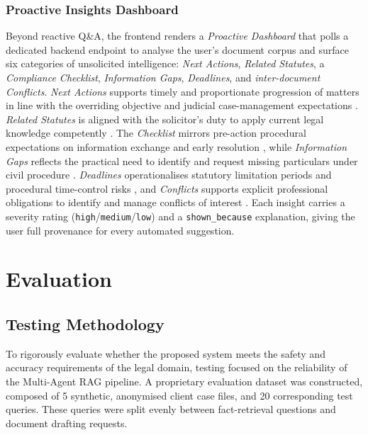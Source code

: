 \documentclass[11pt,a4paper]{article}
\begin{document}
\subsubsection{Proactive Insights Dashboard}

Beyond reactive Q\&A, the frontend renders a \textit{Proactive Dashboard} that polls a
dedicated backend endpoint to analyse the user's document corpus and surface six categories
of unsolicited intelligence: \textit{Next Actions}, \textit{Related Statutes}, a
\textit{Compliance Checklist}, \textit{Information Gaps}, \textit{Deadlines}, and
\textit{inter-document Conflicts}.  \textit{Next Actions} supports timely and proportionate progression of
matters in line with the overriding objective and judicial case-management expectations
\cite{cpr1_2025,cpr3_2025}.  \textit{Related Statutes} is aligned with the solicitor's duty
to apply current legal knowledge competently \cite{sra_competence_2023,sra2023}.  The
\textit{Checklist} mirrors pre-action procedural expectations on information exchange and
early resolution \cite{cpr_papd_2025}, while \textit{Information Gaps} reflects the practical
need to identify and request missing particulars under civil procedure \cite{cpr18_2025}.
\textit{Deadlines} operationalises statutory limitation periods and procedural time-control
risks \cite{limitation1980,cpr3_2025}, and \textit{Conflicts} supports explicit professional
obligations to identify and manage conflicts of interest \cite{sra2023}.  Each insight
carries a severity rating (\texttt{high}/\texttt{medium}/\texttt{low}) and a
\texttt{shown\_because} explanation, giving the user full provenance for every automated
suggestion.

\section{Evaluation}
\label{sec:evaluation}

\subsection{Testing Methodology}

To rigorously evaluate whether the proposed system meets the safety and accuracy requirements of the legal domain, testing focused on the reliability of the Multi-Agent RAG pipeline. A proprietary evaluation dataset was constructed, composed of 5 synthetic, anonymised client case files, and 20 corresponding test queries. These queries were split evenly between fact-retrieval questions and document drafting requests.
\end{document}

